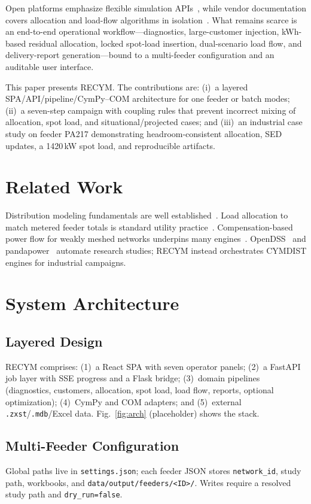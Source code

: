 \documentclass[journal]{IEEEtran}
\begin{document}
Open platforms emphasize flexible simulation APIs~\cite{dugan2011}, while vendor
documentation covers allocation and load-flow algorithms in
isolation~\cite{cyme_alloc,cyme_lf}.
What remains scarce is an end-to-end operational workflow---diagnostics,
large-customer injection, kWh-based residual allocation, locked spot-load
insertion, dual-scenario load flow, and delivery-report generation---bound to a
multi-feeder configuration and an auditable user interface.

This paper presents RECYM. The contributions are:
(i)~a layered SPA/API/pipeline/CymPy--COM architecture for one feeder or batch
modes;
(ii)~a seven-step campaign with coupling rules that prevent incorrect mixing of
allocation, spot load, and situational/projected cases; and
(iii)~an industrial case study on feeder PA217 demonstrating headroom-consistent
allocation, SED updates, a 1420\,kW spot load, and reproducible artifacts.

\section{Related Work}
Distribution modeling fundamentals are well established~\cite{kersting2017,gonen2014}.
Load allocation to match metered feeder totals is standard utility
practice~\cite{cyme_alloc}.
Compensation-based power flow for weakly meshed networks underpins many
engines~\cite{shirmohammadi1988}.
OpenDSS~\cite{dugan2011} and pandapower~\cite{thurner2018} automate research
studies; RECYM instead orchestrates CYMDIST engines for industrial campaigns.

\section{System Architecture}
\subsection{Layered Design}
RECYM comprises: (1)~a React SPA with seven operator panels;
(2)~a FastAPI job layer with SSE progress and a Flask bridge;
(3)~domain pipelines (diagnostics, customers, allocation, spot load, load flow,
reports, optional optimization);
(4)~CymPy and COM adapters; and
(5)~external \texttt{.zxst}/\texttt{.mdb}/Excel data.
Fig.~\ref{fig:arch} (placeholder) shows the stack.

\subsection{Multi-Feeder Configuration}
Global paths live in \texttt{settings.json}; each feeder JSON stores
\texttt{network\_id}, study path, workbooks, and
\texttt{data/output/feeders/<ID>/}.
Writes require a resolved study path and \texttt{dry\_run=false}.
\end{document}
